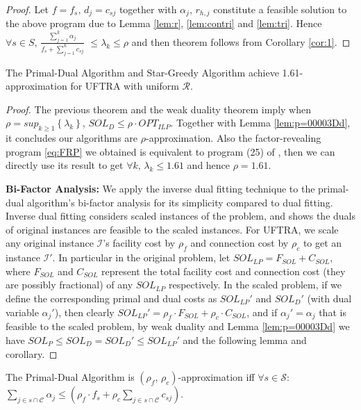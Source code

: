 \documentclass[10pt]{llncs}
\begin{document}
\begin{proof}
Let $f=f_{s},\, d_{j}=c_{sj}$ together with $\alpha_{j},\, r_{h,j}$
constitute a feasible solution to the above program due to Lemma \ref{lem:r},
\ref{lem:contri} and \ref{lem:tri}. Hence $\forall s\in S,\,{\displaystyle \frac{\sum_{j=1}^{k}\alpha_{j}}{f_{s}+\sum_{j=1}^{k}c_{sj}}}$
$\leq\lambda_{k}\leq\rho$ and then theorem follows from Corollary
\ref{cor:1}.\end{proof}
\begin{theorem}
The Primal-Dual Algorithm and Star-Greedy Algorithm achieve 1.61-approximation
for UFTRA with uniform $\mathcal{R}$.\end{theorem}
\begin{proof}
The previous theorem and the weak duality theorem imply when $\rho=sup_{k\geq1}\left\{ \lambda_{k}\right\} $,
$SOL_{D}\leq$$\rho\cdot OPT_{ILP}$. Together with Lemma \ref{lem:p=00003Dd},
it concludes our algorithms are $\rho$-approximation. Also the factor-revealing
program \eqref{eq:FRP} we obtained is equivalent to program (25)
of \cite{Jain03dualfitting}, then we can directly use its result
to get $\forall k,\,\lambda_{k}\leq1.61$ and hence $\rho=1.61$.\medskip{}


\textbf{Bi-Factor Analysis: }We apply the inverse dual fitting technique
\cite{shihongftfa} to the primal-dual algorithm's bi-factor analysis
for its simplicity compared to dual fitting. Inverse dual fitting
considers scaled instances of the problem, and shows the duals of
original instances are feasible to the scaled instances. For UFTRA,
we scale any original instance $\mathcal{I}$'s facility cost by $\rho_{f}$
and connection cost by $\rho_{c}$ to get an instance $\mathcal{I}'$.
In particular in the original problem, let $SOL_{LP}=F_{SOL}+C_{SOL}$,
where $F_{SOL}$ and $C_{SOL}$ represent the total facility cost
and connection cost (they are possibly fractional) of any $SOL_{LP}$
respectively. In the scaled problem, if we define the corresponding
primal and dual costs as $SOL_{LP}'$ and $SOL_{D}'$ (with dual variable
$\alpha_{j}'$), then clearly $SOL_{LP}'=\rho_{f}\cdot F_{SOL}+\rho_{c}\cdot C_{SOL}$,
and if $\alpha_{j}'=\alpha_{j}$ that is feasible to the scaled problem,
by weak duality and Lemma \ref{lem:p=00003Dd} we have $SOL_{P}\leq SOL_{D}=SOL_{D}'\leq SOL_{LP}'$
and the following lemma and corollary.\end{proof}
\begin{lemma}
The Primal-Dual Algorithm is $\left(\rho_{f},\,\rho_{c}\right)$-approximation
iff $\forall s\in\mathcal{S}:\,$$\sum_{j\in s\cap\mathcal{C}}\alpha_{j}\leq\left(\rho_{f}\cdot f_{s}+\rho_{c}\sum_{j\in s\cap\mathcal{C}}c_{sj}\right)$.\end{lemma}
\end{document}
